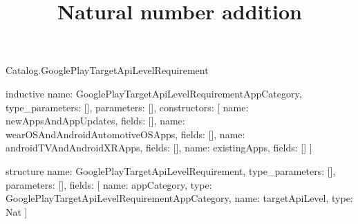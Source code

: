 \begin{lexlean}{Catalog.GooglePlayTargetApiLevelRequirement}
\title{Natural number addition}
\begin{semanticmodule}
inductive{
  name: GooglePlayTargetApiLevelRequirementAppCategory,
  type_parameters: [],
  parameters: [],
  constructors: [
    {name: newAppsAndAppUpdates, fields: []},
    {name: wearOSAndAndroidAutomotiveOSApps, fields: []},
    {name: androidTVAndAndroidXRApps, fields: []},
    {name: existingApps, fields: []}
  ]
}

structure{
  name: GooglePlayTargetApiLevelRequirement,
  type_parameters: [],
  parameters: [],
  fields: [
    {name: appCategory, type: GooglePlayTargetApiLevelRequirementAppCategory},
    {name: targetApiLevel, type: Nat}
  ]
}
\end{semanticmodule}
\end{lexlean}
